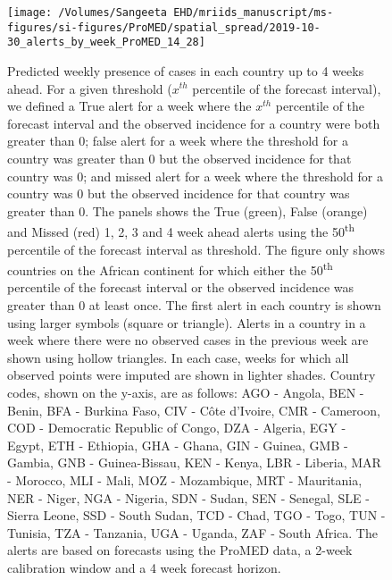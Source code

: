 \documentclass[9pt,twoside,lineno]{pnas-new}
\begin{document}
\begin{figure}
\centering
\texttt{[image: /Volumes/Sangeeta EHD/mriids\_manuscript/ms-figures/si-figures/ProMED/spatial\_spread/2019-10-30\_alerts\_by\_week\_ProMED\_14\_28]}
\caption{Predicted weekly presence of cases in
each country up to 4 weeks ahead. For a given threshold (\(x^{th}\)
percentile of the forecast interval), we defined a True alert for a week
where the \(x^{th}\) percentile of the forecast interval and the
observed incidence for a country were both greater than 0; false alert
for a week where the threshold for a country was greater than 0 but the
observed incidence for that country was 0; and missed alert for a week where
the threshold for a country was 0 but the observed incidence for that
country was greater than 0. The panels shows the True (green), False (orange) and
Missed (red) 1, 2, 3 and 4 week ahead alerts using the 
50\textsuperscript{th} percentile of the forecast interval as threshold. 
The figure only shows countries on the
African continent for which either the 50\textsuperscript{th}
percentile of the forecast interval or the
observed incidence was greater than 0 at least once. 
The first alert in each country is shown
using larger symbols (square or triangle). Alerts in a country in a
week where there were no observed cases in the previous week are shown
using hollow triangles. In each case, weeks for which all observed points
were imputed are shown in lighter shades.
Country codes, shown on the y-axis, are as
follows: AGO - Angola, BEN - Benin, BFA - Burkina Faso, CIV - Côte
d'Ivoire, CMR - Cameroon, COD - Democratic Republic of Congo, DZA -
Algeria, EGY - Egypt, ETH - Ethiopia, 
GHA - Ghana, GIN - Guinea, GMB - Gambia, GNB - Guinea-Bissau, 
KEN - Kenya, LBR - Liberia, MAR - Morocco, 
MLI - Mali,
MOZ - Mozambique,
MRT - Mauritania,
NER - Niger,
NGA - Nigeria,
SDN - Sudan,
SEN - Senegal,
SLE - Sierra Leone,
SSD - South Sudan,
TCD - Chad,
TGO - Togo,
TUN - Tunisia,
TZA - Tanzania,
UGA - Uganda,
ZAF - South Africa. The alerts are based on forecasts 
using the ProMED data, a 2-week calibration window and a 4 week
forecast horizon.}
\label{fig:alerts4weekahead}
\end{figure}\FloatBarrier
\end{document}
